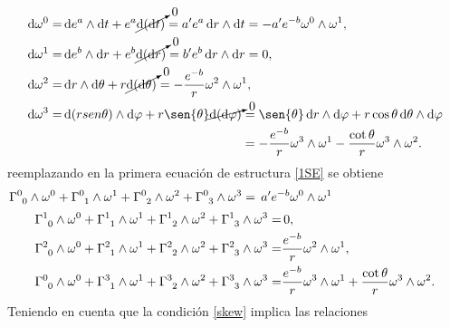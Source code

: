     \begin{align}
    \begin{split}
        \dd{\omega^0}=&\dd{e^a} \wedge \dd{t}+e^a\cancelto{0}{\dd{(\dd{t})}} = a^{\prime} e^a \dd{r}\wedge\dd{t} = -a^{\prime} e^{-b} \omega^0 \wedge \omega^1, \\
        \dd{\omega^1}=&\dd{e^b}\wedge\dd{r}+e^b\cancelto{0}{\dd{(\dd{r})}} = b^{\prime}e^b\dd{r}\wedge\dd{r}=0, \\
        \dd{\omega^2}=&\dd{r}\wedge\dd{\theta} + r\cancelto{0}{\dd{(\dd{\theta})}} = -\frac{e^{-b}}{r}\omega^2 \wedge\omega^1, \\
        \dd{\omega^3}=&\dd{(rsen\theta)}\wedge\dd{\varphi} + r\sen{\theta}\cancelto{0}{\dd{(\dd{\varphi})}} = \sen{\theta}\dd{r}\wedge\dd{\varphi} + r\cos{\theta}\dd{\theta}\wedge\dd{\varphi} \\
        & \phantom{{}\dd{(rsen\theta)}\wedge\dd{\varphi} + r\sen{\theta}\cancelto{0}{\dd{(\dd{\varphi})}}} = -\frac{e^{-b}}{r} \omega^3 \wedge \omega^1 - \frac{\cot{\theta}}{r} \omega^3 \wedge \omega^2.
    \end{split}
    \end{align}
reemplazando en la primera ecuación de estructura \eqref{1SE} se obtiene
    \begin{equation*}
        \tensor{\Gamma}{^0_0}\wedge\omega^0 + \tensor{\Gamma}{^0_1}\wedge\omega^1+\tensor{\Gamma}{^0_2}\wedge\omega^2+\tensor{\Gamma}{^0_3}\wedge\omega^3 = \,a^{\prime} e^{-b} \omega^0 \wedge \omega^1 \hspace*{3.6cm}
    \end{equation*}
    \begin{align}
    \begin{split}
        \tensor{\Gamma}{^1_0}\wedge\omega^0 + \tensor{\Gamma}{^1_1}\wedge\omega^1+\tensor{\Gamma}{^1_2}\wedge\omega^2+\tensor{\Gamma}{^1_3}\wedge\omega^3 =&\, 0, \\
        \tensor{\Gamma}{^2_0}\wedge\omega^0 + \tensor{\Gamma}{^2_1}\wedge\omega^1+\tensor{\Gamma}{^2_2}\wedge\omega^2+\tensor{\Gamma}{^2_3}\wedge\omega^3 =& \frac{e^{-b}}{r}\omega^2 \wedge\omega^1, \\
        \tensor{\Gamma}{^0_0}\wedge\omega^0 + \tensor{\Gamma}{^3_1}\wedge\omega^1+\tensor{\Gamma}{^3_2}\wedge\omega^2+\tensor{\Gamma}{^3_3}\wedge\omega^3 =& \frac{e^{-b}}{r} \omega^3 \wedge \omega^1 + \frac{\cot{\theta}}{r} \omega^3 \wedge \omega^2.
        \end{split}\label{1ee}
    \end{align}    
Teniendo en cuenta que la condición \eqref{skew} implica las relaciones 
